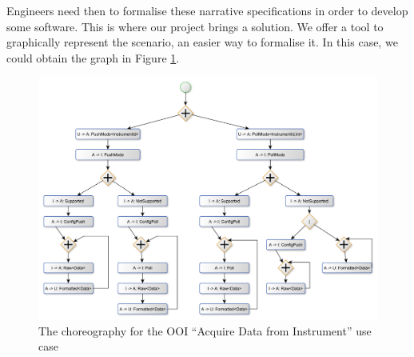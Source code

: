 \documentclass[a4paper,11pt,twoside]{report}
\begin{document}
Engineers need then to formalise these narrative specifications in order to develop some software. This is where our project brings a solution. We offer a tool to graphically represent the scenario, an easier way to formalise it. In this case, we could obtain the graph in Figure \ref{fig:ooi_graph}.

\begin{figure}[h]
\begin{center}
\includegraphics[scale=0.45]{ooi_graph}
\end{center}
\caption{The choreography for the OOI ``Acquire Data from Instrument'' use case}\label{fig:ooi_graph}
\end{figure}
\end{document}
